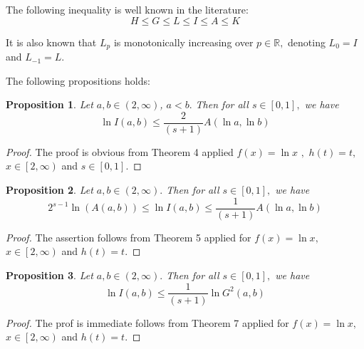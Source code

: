 \documentclass{amsart}
\theoremstyle{plain}
\newtheorem{proposition}{Proposition}
\numberwithin{equation}{section}
\begin{document}
\bigskip

\bigskip The following inequality is well known in the literature:\begin{equation*}
H\leq G\leq L\leq I\leq A\leq K
\end{equation*}

It is also known that $L_{p}$ is monotonically increasing over $p\in 
\mathbb{R}
,$ denoting $L_{0}=I$ and $L_{-1}=L.$

The following propositions holds:

\begin{proposition}
\bigskip Let $a,b\in \left( 2,\infty \right) $, $a<b.$ Then for all $s\in \left[ 0,1\right] ,$ we have\begin{equation}
\ln I\left( a,b\right) \leq \frac{2}{\left( s+1\right) }A\left( \ln a,\ln
b\right)  \tag{3.2}
\end{equation}
\end{proposition}

\begin{proof}
The proof is obvious from Theorem 4 applied $f\left( x\right) =\ln x$ $,$ $h\left( t\right) =t,$ $x\in \left[ 2,\infty \right) $ and $s\in \left[ 0,1\right] .$
\end{proof}

\begin{proposition}
Let $a,b\in \left( 2,\infty \right) .$ Then for all $s\in \left[ 0,1\right]
, $ we have\begin{equation}
2^{s-1}\ln \left( A(a,b)\right) \leq \ln I\left( a,b\right) \leq \frac{1}{\left( s+1\right) }A\left( \ln a,\ln b\right)  \tag{3.1}
\end{equation}
\end{proposition}

\begin{proof}
The assertion follows from Theorem 5 applied for $f\left( x\right) =\ln x,$ $x\in \left[ 2,\infty \right) $ and $h\left( t\right) =t.$
\end{proof}

\begin{proposition}
Let $a,b\in \left( 2,\infty \right) .$ Then for all $s\in \left[ 0,1\right]
, $ we have\begin{equation}
\ln I\left( a,b\right) \leq \frac{1}{\left( s+1\right) }\ln G^{2}\left(
a,b\right)  \tag{3.3}
\end{equation}
\end{proposition}

\begin{proof}
The prof is immediate follows from Theorem 7 applied for $f\left( x\right)
=\ln x,$ $x\in \left[ 2,\infty \right) $ and $h\left( t\right) =t.$
\end{proof}
\end{document}
